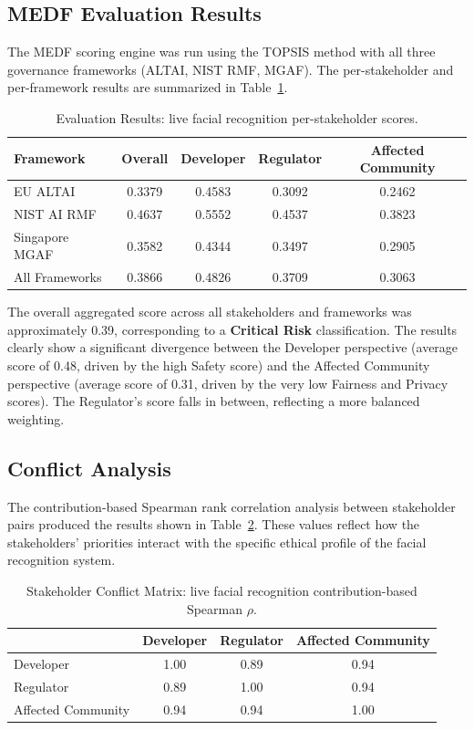 \subsection{MEDF Evaluation Results}

The MEDF scoring engine was run using the TOPSIS method with all three governance frameworks (ALTAI, NIST RMF, MGAF). The per-stakeholder and per-framework results are summarized in Table~\ref{tab:cs1_results}.

\begin{table}[H]
\centering
\caption{Evaluation Results: live facial recognition per-stakeholder scores.}
\label{tab:cs1_results}
\begin{tabular}{@{}lcccc@{}}
\toprule
\textbf{Framework} & \textbf{Overall} & \textbf{Developer} & \textbf{Regulator} & \textbf{Affected Community} \\
\midrule
EU ALTAI        & 0.3379 & 0.4583 & 0.3092 & 0.2462 \\
NIST AI RMF     & 0.4637 & 0.5552 & 0.4537 & 0.3823 \\
Singapore MGAF  & 0.3582 & 0.4344 & 0.3497 & 0.2905 \\
\midrule
All Frameworks  & 0.3866 & 0.4826 & 0.3709 & 0.3063 \\
\bottomrule
\end{tabular}
\end{table}

The overall aggregated score across all stakeholders and frameworks was approximately 0.39, corresponding to a \textbf{Critical Risk} classification. The results clearly show a significant divergence between the Developer perspective (average score of 0.48, driven by the high Safety score) and the Affected Community perspective (average score of 0.31, driven by the very low Fairness and Privacy scores). The Regulator's score falls in between, reflecting a more balanced weighting.

\subsection{Conflict Analysis}

The contribution-based Spearman rank correlation analysis between stakeholder pairs produced the results shown in Table~\ref{tab:cs1_conflict}. These values reflect how the stakeholders' priorities interact with the specific ethical profile of the facial recognition system.

\begin{table}[H]
\centering
\caption{Stakeholder Conflict Matrix: live facial recognition contribution-based Spearman $\rho$.}
\label{tab:cs1_conflict}
\begin{tabular}{@{}lccc@{}}
\toprule
 & \textbf{Developer} & \textbf{Regulator} & \textbf{Affected Community} \\
\midrule
Developer           & 1.00 &  0.89 &  0.94 \\
Regulator           & 0.89 &  1.00 &  0.94 \\
Affected Community  & 0.94 &  0.94 &  1.00 \\
\bottomrule
\end{tabular}
\end{table}

